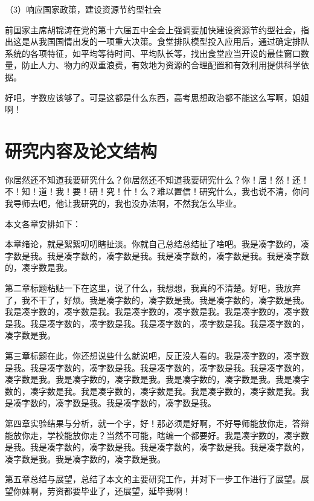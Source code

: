 \documentclass[a4paper,12pt]{book} %
\begin{document}
（3）响应国家政策，建设资源节约型社会

前国家主席胡锦涛在党的第十六届五中全会上强调要加快建设资源节约型社会，指出这是从我国国情出发的一项重大决策。食堂排队模型投入应用后，通过确定排队系统的各项特征，如平均等待时间、平均队长等，找出食堂应当开设的最佳窗口数量，防止人力、物力的双重浪费，有效地为资源的合理配置和有效利用提供科学依据。 

好吧，字数应该够了。可是这都是什么东西，高考思想政治都不能这么写啊，姐姐啊！

\section{研究内容及论文结构}

你居然还不知道我要研究什么？你居然还不知道我要研究什么？你！居！然！还！不！知！道！我！要！研！究！什！么？难以置信！研究什么，我也说不清，你问我导师去吧，他让我研究的，我也没办法啊，不然我怎么毕业。

本文各章安排如下：

本章绪论，就是絮絮叨叨瞎扯淡。你就自己总结总结扯了啥吧。我是凑字数的，凑字数是我。我是凑字数的，凑字数是我。我是凑字数的，凑字数是我。我是凑字数的，凑字数是我。

第二章标题粘贴一下在这里，说了什么，我想想，我真的不清楚。好吧，我放弃了，我不干了，好烦。我是凑字数的，凑字数是我。我是凑字数的，凑字数是我。我是凑字数的，凑字数是我。我是凑字数的，凑字数是我。我是凑字数的，凑字数是我。我是凑字数的，凑字数是我。我是凑字数的，凑字数是我。我是凑字数的，凑字数是我。

第三章标题在此，你还想说些什么就说吧，反正没人看的。我是凑字数的，凑字数是我。我是凑字数的，凑字数是我。我是凑字数的，凑字数是我。我是凑字数的，凑字数是我。我是凑字数的，凑字数是我。我是凑字数的，凑字数是我。我是凑字数的，凑字数是我。我是凑字数的，凑字数是我。我是凑字数的，凑字数是我。我是凑字数的，凑字数是我。我是凑字数的，凑字数是我。

第四章实验结果与分析，就一个字，好！那必须是好啊，不好导师能放你走，答辩能放你走，学校能放你走？当然不可能，瞎编一个都要好。我是凑字数的，凑字数是我。我是凑字数的，凑字数是我。我是凑字数的，凑字数是我。我是凑字数的，凑字数是我。我是凑字数的，凑字数是我。

第五章总结与展望，总结了本文的主要研究工作，并对下一步工作进行了展望。展望你妹啊，劳资都要毕业了，还展望，延毕我啊！

\clearpage{\pagestyle{empty}\cleardoublepage}


\end{document}
